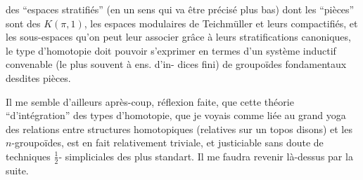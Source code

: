 des ``espaces stratifiés'' (en un sens qui
va être précisé plus bas) dont les
``pièces'' sont des $K(\pi,1)$, 
les espaces modulaires de Teichmüller
et leurs compactifiés, et les sous-espaces
qu'on peut leur associer grâce à leurs
stratifications canoniques, le type
d'homotopie doit pouvoir s'exprimer
en termes d'un système inductif
convenable (le plus souvent à ens. d'in-
dices fini) de groupoïdes fondamentaux
desdites pièces.

Il me semble d'ailleurs après-coup,
réflexion faite, que cette théorie ``d'intégration''
des types d'homotopie, que 
je voyais comme liée au grand yoga des
relations entre structures homotopiques (relatives
sur un topos disons) et les $n$-groupoïdes,
est en fait relativement triviale, et
justiciable sans doute de techniques $\frac12$-
simpliciales des plus standart. Il me
faudra revenir là-dessus par la suite.
